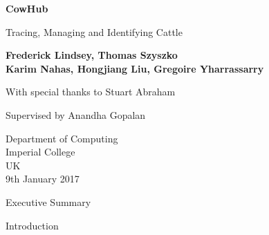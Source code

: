 \documentclass[twoside, a4paper, titlepage]{article}
\begin{document}
\begin{titlepage}
    \begin{center}
        \vspace*{1cm}
        
        \huge{\textbf{CowHub}}
        
        \vspace{0.5cm}
		\Large{Tracing, Managing and Identifying Cattle}
        
        \vspace{1.5cm}
        
        \large{
	        \textbf{
	        	Frederick Lindsey, Thomas Szyszko \\
				Karim Nahas, Hongjiang Liu, Gregoire Yharrassarry
			}
		}
        
        \large{With special thanks to Stuart Abraham}
        
        \vfill
        
        \large{Supervised by Anandha Gopalan}
        
        \vspace{0.8cm}
        
        Department of Computing\\
		Imperial College\\
        UK\\
        9th January 2017
        
    \end{center}
\end{titlepage}


\tableofcontents
\newpage


\begin{section}{Executive Summary}

\end{section}

\newpage
\begin{section}{Introduction}

\end{section}
\end{document}
